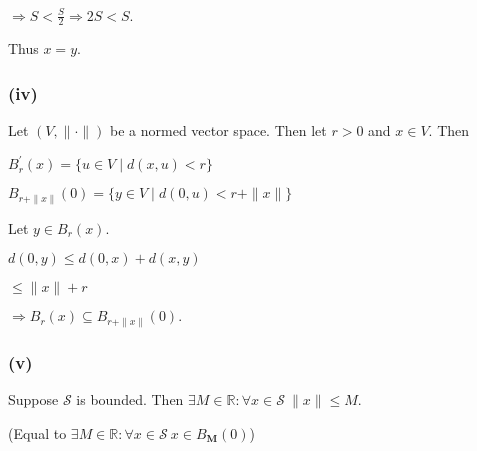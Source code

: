 \documentclass{article}
\theoremstyle{definition}
\numberwithin{equation}{section}
\begin{document}
$
\Rightarrow S < \frac{S}{2} \Rightarrow 2S < S.
$

Thus \( x = y \).

\subsubsection*{(iv)}
Let \((V, \| \cdot \| )\) be a normed vector space. Then let \( r > 0 \) and \( x \in V \). Then 

$
B_r^{'}(x) = \{ u \in V \mid d(x,u) < r \}
$

$
B_{r + \| x \| } (0) = \{y \in V \mid d(0,u) < r + \| x \| \}
$

\begin{center}
\end{center}

Let \( y \in B_r(x) \).

$
d(0,y) \leq d(0,x) + d(x,y)
$

$
\leq \| x \| + r
$

$
\Rightarrow B_r(x) \subseteq B_{r + \| x \|}(0).
$

\subsubsection*{(v)}
Suppose \(\mathscr{S}\) is bounded. Then \(\exists M \in \mathbb{R} : \forall x \in \mathscr{S} \: \| x \| \leq M\).

(Equal to \(\exists M \in \mathbb{R} : \forall x \in \mathscr{S} \: x \in B_{\textbf{M}} (0)\))
\end{document}

